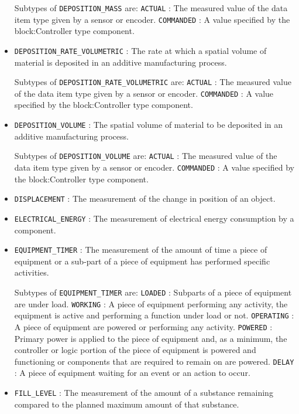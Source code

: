 \begin{itemize}
Subtypes of \texttt{DEPOSITION_MASS} are: 
\newline\tab \texttt{ACTUAL} : The measured value of the data item type given by a sensor or encoder. 
\newline\tab \texttt{COMMANDED} : A value specified by the {block:Controller} type component. 
\item \texttt{DEPOSITION_RATE_VOLUMETRIC} : The rate at which a spatial volume of material is deposited in an additive manufacturing process. 

Subtypes of \texttt{DEPOSITION_RATE_VOLUMETRIC} are: 
\newline\tab \texttt{ACTUAL} : The measured value of the data item type given by a sensor or encoder. 
\newline\tab \texttt{COMMANDED} : A value specified by the {block:Controller} type component. 
\item \texttt{DEPOSITION_VOLUME} : The spatial volume of material to be deposited in an additive manufacturing process. 

Subtypes of \texttt{DEPOSITION_VOLUME} are: 
\newline\tab \texttt{ACTUAL} : The measured value of the data item type given by a sensor or encoder. 
\newline\tab \texttt{COMMANDED} : A value specified by the {block:Controller} type component. 
\item \texttt{DISPLACEMENT} : The measurement of the change in position of an object. 

\item \texttt{ELECTRICAL_ENERGY} : The measurement of electrical energy consumption by a component. 

\item \texttt{EQUIPMENT_TIMER} : The measurement of the amount of time a piece of equipment or a sub-part of a piece of equipment has performed specific activities. 

Subtypes of \texttt{EQUIPMENT_TIMER} are: 
\newline\tab \texttt{LOADED} : Subparts of a piece of equipment are under load. 
\newline\tab \texttt{WORKING} : A piece of equipment performing any activity, the equipment is active and performing a function under load or not. 
\newline\tab \texttt{OPERATING} : A piece of equipment are powered or performing any activity. 
\newline\tab \texttt{POWERED} : Primary  power is  applied  to the  piece  of  equipment and,  as  a minimum, the controller or logic portion of the piece of equipment is powered and functioning or components that are required to remain on are powered. 
\newline\tab \texttt{DELAY} : A piece of equipment waiting for an event or an action to occur. 
\item \texttt{FILL_LEVEL} : The measurement of the amount of a substance remaining compared to the planned maximum amount of that substance. 


\end{itemize}

